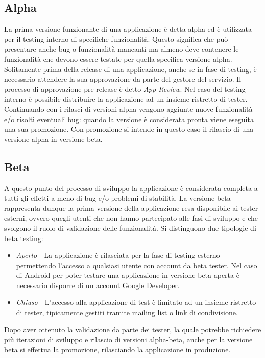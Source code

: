 \subsection{Alpha}
La prima versione funzionante di una applicazione è detta alpha ed è utilizzata per il testing interno di specifiche funzionalità. Questo significa che può presentare anche bug o funzionalità mancanti ma almeno deve contenere le funzionalità che devono essere testate per quella specifica versione alpha. \\
Solitamente prima della release di una applicazione, anche se in fase di testing, è necessario attendere la sua approvazione da parte del gestore del servizio. Il processo di approvazione pre-release è detto \textit{App Review}. Nel caso del testing interno è possibile distribuire la applicazione ad un insieme ristretto di tester.\\
Continuando con i rilasci di versioni alpha vengono aggiunte nuove funzionalità e/o risolti eventuali bug: quando la versione è considerata pronta viene eseguita una sua promozione. Con promozione si intende in questo caso il rilascio di una versione alpha in versione beta.

\subsection{Beta}
A questo punto del processo di sviluppo la applicazione è considerata completa a tutti gli effetti a meno di bug e/o problemi di stabilità. La versione beta rappresenta dunque la prima versione della applicazione resa disponibile ai tester esterni, ovvero quegli utenti che non hanno partecipato alle fasi di sviluppo e che svolgono il ruolo di validazione delle funzionalità. Si distinguono due tipologie di beta testing:
\begin{itemize}
    \item \textit{Aperto} - La applicazione è rilasciata per la fase di testing esterno permettendo l'accesso a qualsiasi utente con account da beta tester. Nel caso di Android per poter testare una applicazione in versione beta aperta è necessario disporre di un account Google Developer.
    \item \textit{Chiuso} - L'accesso alla applicazione di test è limitato ad un insieme ristretto di tester, tipicamente gestiti tramite mailing list o link di condivisione.
\end{itemize}
Dopo aver ottenuto la validazione da parte dei tester, la quale potrebbe richiedere più iterazioni di sviluppo e rilascio di versioni alpha-beta, anche per la versione beta si effettua la promozione, rilasciando la applicazione in produzione.


